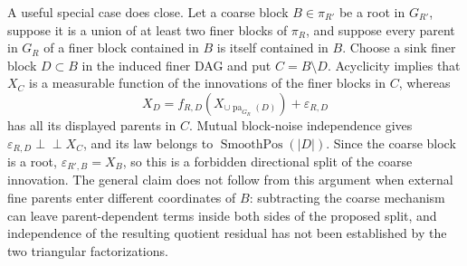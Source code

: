 A useful special case does close.  Let a coarse block \(B\in\pi_{R'}\) be a root in \(G_{R'}\), suppose it is a union of at least two finer blocks of \(\pi_R\), and suppose every parent in \(G_R\) of a finer block contained in \(B\) is itself contained in \(B\).  Choose a sink finer block \(D\subset B\) in the induced finer DAG and put \(C=B\setminus D\).  Acyclicity implies that \(X_C\) is a measurable function of the innovations of the finer blocks in \(C\), whereas
\[
 X_D=f_{R,D}(X_{\cup\operatorname{pa}_{G_R}(D)})+\varepsilon_{R,D}
\]
has all its displayed parents in \(C\).  Mutual block-noise independence gives \(\varepsilon_{R,D}\perp\!\!\!\perp X_C\), and its law belongs to \(\operatorname{SmoothPos}(|D|)\).  Since the coarse block is a root, \(\varepsilon_{R',B}=X_B\), so this is a forbidden directional split of the coarse innovation.  The general claim does not follow from this argument when external fine parents enter different coordinates of \(B\): subtracting the coarse mechanism can leave parent-dependent terms inside both sides of the proposed split, and independence of the resulting quotient residual has not been established by the two triangular factorizations.